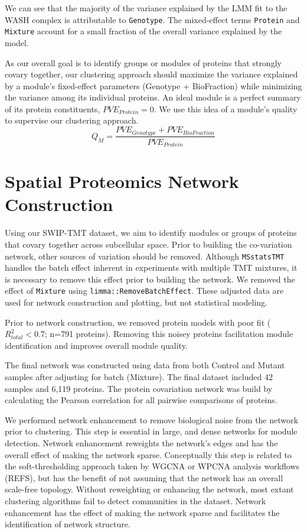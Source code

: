 \documentclass[11pt]{elife}\usepackage[]{graphicx}\usepackage[]{color}
\begin{document}
We can see that the majority of the variance explained by the LMM fit to the
WASH complex is attributable to \texttt{Genotype}. The mixed-effect terms
\texttt{Protein} and \texttt{Mixture} account for a small fraction of the 
overall variance explained by the model.

As our overall goal is to identify groups or modules of proteins that strongly
covary together, our clustering approach should maximize the variance explained
by a module's fixed-effect parameters (Genotype + BioFraction) while minimizing 
the variance among its individual proteins. 
An ideal module is a perfect summary of its protein constituents, 
$PVE_{Protein}=0$. We use this idea of a module's quality to supervise our 
clustering approach.
\begin{equation}
	Q_{M}=\frac{PVE_{Genotype} + PVE_{BioFraction}}{PVE_{Protein}}
\end{equation}


\section{Spatial Proteomics Network Construction}

Using our SWIP-TMT dataset, we aim to identify modules or groups of
proteins that covary together across subcellular space. Prior to building the
co-variation network, other sources of variation should be removed. Although
\texttt{MSstatsTMT} handles the batch effect inherent in experiments with
multiple TMT mixtures, it is necessary to remove this effect prior to building
the network. We removed the effect of \texttt{Mixture} using
\texttt{limma::RemoveBatchEffect}. These adjusted data are used for network
construction and plotting, but not statistical modeling.

Prior to network construction, we removed protein models with poor fit 
($R^2_{total}<0.7$; n=791 proteins). Removing this noisey proteins facilitation
module identification and improves overall module quality.

The final network was constructed using data from both Control and Mutant 
samples after adjusting for batch (Mixture). The final dataset included 
42 samples and 6,119 proteins. The protein covariation network was build by
calculating the Pearson correlation for all pairwise comparisons of proteins.

We performed network enhancement to remove biological noise from the network
prior to clustering. This step is essential in large, and dense networks for
module detection. Network enhancement reweights the
network's edges and has the overall effect of making the network sparse.
Conceptually this step is related to the soft-thresholding approach taken by
WGCNA or WPCNA analysis workflows (REFS), but has the benefit of not assuming
that the network has an overall scale-free topology.  Without reweighting or
enhancing the network, most extant clustering algorithms fail to detect
communities in the dataset.  Network enhancement has the effect of making the
network sparse and facilitates the identification of network structure.\\
\end{document}
